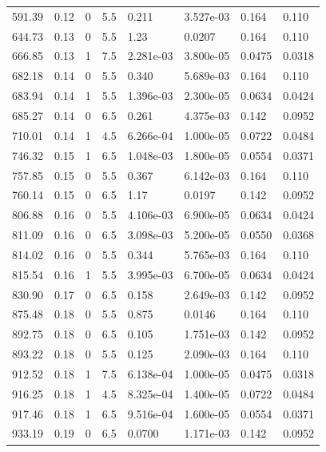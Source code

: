 \documentclass[preview]{standalone}
\begin{document}
{{{\begin{tabular}{L{1.2cm}C{1.2cm} C{0.3cm}C{0.5cm} C{1.4cm}C{1.4cm} C{1.4cm}C{1.4cm}}
  591.39  &  0.12  & 0     & 5.5 &  0.211  & 3.527e-03  & 0.164 &  0.110   \\ 
  644.73  &  0.13  & 0     & 5.5 &  1.23  & 0.0207  & 0.164 &  0.110   \\ 
  666.85  &  0.13  & 1     & 7.5 &  2.281e-03  & 3.800e-05  & 0.0475 &  0.0318   \\ 
  682.18  &  0.14  & 0     & 5.5 &  0.340  & 5.689e-03  & 0.164 &  0.110   \\ 
  683.94  &  0.14  & 1     & 5.5 &  1.396e-03  & 2.300e-05  & 0.0634 &  0.0424   \\ 
  685.27  &  0.14  & 0     & 6.5 &  0.261  & 4.375e-03  & 0.142 &  0.0952   \\ 
  710.01  &  0.14  & 1     & 4.5 &  6.266e-04  & 1.000e-05  & 0.0722 &  0.0484   \\ 
  746.32  &  0.15  & 1     & 6.5 &  1.048e-03  & 1.800e-05  & 0.0554 &  0.0371   \\ 
  757.85  &  0.15  & 0     & 5.5 &  0.367  & 6.142e-03  & 0.164 &  0.110   \\ 
  760.14  &  0.15  & 0     & 6.5 &  1.17  & 0.0197  & 0.142 &  0.0952   \\ 
  806.88  &  0.16  & 0     & 5.5 &  4.106e-03  & 6.900e-05  & 0.0634 &  0.0424   \\ 
  811.09  &  0.16  & 0     & 6.5 &  3.098e-03  & 5.200e-05  & 0.0550 &  0.0368   \\ 
  814.02  &  0.16  & 0     & 5.5 &  0.344  & 5.765e-03  & 0.164 &  0.110   \\ 
  815.54  &  0.16  & 1     & 5.5 &  3.995e-03  & 6.700e-05  & 0.0634 &  0.0424   \\ 
  830.90  &  0.17  & 0     & 6.5 &  0.158  & 2.649e-03  & 0.142 &  0.0952   \\ 
  875.48  &  0.18  & 0     & 5.5 &  0.875  & 0.0146  & 0.164 &  0.110   \\ 
  892.75  &  0.18  & 0     & 6.5 &  0.105  & 1.751e-03  & 0.142 &  0.0952   \\ 
  893.22  &  0.18  & 0     & 5.5 &  0.125  & 2.090e-03  & 0.164 &  0.110   \\ 
  912.52  &  0.18  & 1     & 7.5 &  6.138e-04  & 1.000e-05  & 0.0475 &  0.0318   \\ 
  916.25  &  0.18  & 1     & 4.5 &  8.325e-04  & 1.400e-05  & 0.0722 &  0.0484   \\ 
  917.46  &  0.18  & 1     & 6.5 &  9.516e-04  & 1.600e-05  & 0.0554 &  0.0371   \\ 
  933.19  &  0.19  & 0     & 6.5 &  0.0700  & 1.171e-03  & 0.142 &  0.0952   \\ 

\end{tabular}}}}
\end{document}
